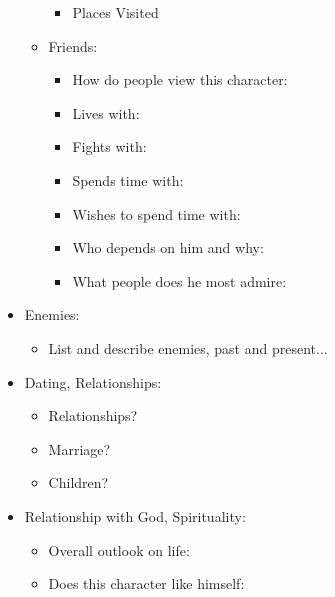 \documentclass[openleft,oneside,showtrims]{memoir}
\begin{document}
\begin{itemize}
\begin{itemize}
\begin{itemize}
\item Places Visited
\end{itemize}

\item Friends:
\label{sec:org5bb23ce}

\begin{itemize}
\item How do people view this character:

\item Lives with:

\item Fights with:

\item Spends time with:

\item Wishes to spend time with:

\item Who depends on him and why:

\item What people does he most admire:
\end{itemize}
\end{itemize}

\item Enemies:
\label{sec:org92852c9}

\begin{itemize}
\item List and describe enemies, past and present...
\end{itemize}

\item Dating, Relationships:
\label{sec:org906d2e6}

\begin{itemize}
\item Relationships?

\item Marriage?

\item Children?
\end{itemize}

\item Relationship with God, Spirituality:
\label{sec:org612a262}

\begin{itemize}
\item Overall outlook on life:

\item Does this character like himself:


\end{itemize}
\end{itemize}
\end{document}
